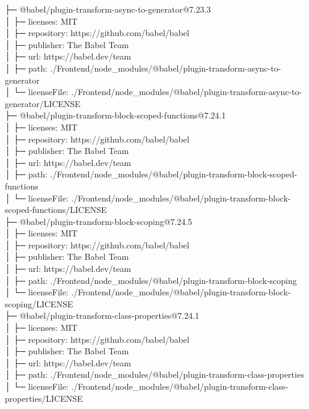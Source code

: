 ├─ @babel/plugin-transform-async-to-generator@7.23.3\\
│  ├─ licenses: MIT\\
│  ├─ repository: https://github.com/babel/babel\\
│  ├─ publisher: The Babel Team\\
│  ├─ url: https://babel.dev/team\\
│  ├─ path: ./Frontend/node\_modules/@babel/plugin-transform-async-to-generator\\
│  └─ licenseFile: ./Frontend/node\_modules/@babel/plugin-transform-async-to-generator/LICENSE\\
├─ @babel/plugin-transform-block-scoped-functions@7.24.1\\
│  ├─ licenses: MIT\\
│  ├─ repository: https://github.com/babel/babel\\
│  ├─ publisher: The Babel Team\\
│  ├─ url: https://babel.dev/team\\
│  ├─ path: ./Frontend/node\_modules/@babel/plugin-transform-block-scoped-functions\\
│  └─ licenseFile: ./Frontend/node\_modules/@babel/plugin-transform-block-scoped-functions/LICENSE\\
├─ @babel/plugin-transform-block-scoping@7.24.5\\
│  ├─ licenses: MIT\\
│  ├─ repository: https://github.com/babel/babel\\
│  ├─ publisher: The Babel Team\\
│  ├─ url: https://babel.dev/team\\
│  ├─ path: ./Frontend/node\_modules/@babel/plugin-transform-block-scoping\\
│  └─ licenseFile: ./Frontend/node\_modules/@babel/plugin-transform-block-scoping/LICENSE\\
├─ @babel/plugin-transform-class-properties@7.24.1\\
│  ├─ licenses: MIT\\
│  ├─ repository: https://github.com/babel/babel\\
│  ├─ publisher: The Babel Team\\
│  ├─ url: https://babel.dev/team\\
│  ├─ path: ./Frontend/node\_modules/@babel/plugin-transform-class-properties\\
│  └─ licenseFile: ./Frontend/node\_modules/@babel/plugin-transform-class-properties/LICENSE\\
